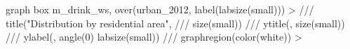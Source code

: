 graph box m_drink_ws, over(urban_2012, label(labsize(small)))
>  ///
title("Distribution by residential area", ///
          size(small)) ///
ytitle(, size(small)) ///
ylabel(, angle(0) labsize(small)) ///
graphregion(color(white))                                    
>                            
